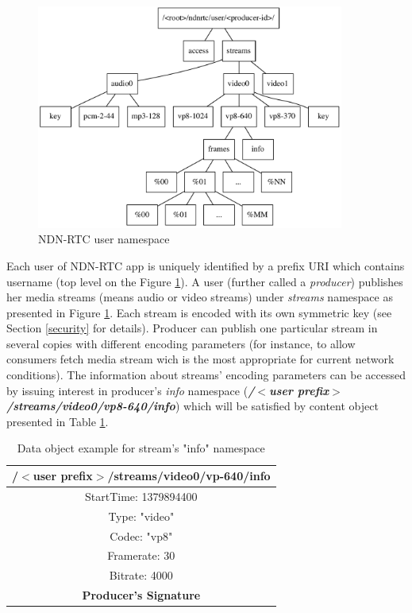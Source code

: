 \documentclass[12pt]{article}
\begin{document}
\begin{figure}[Ht!]
\centering
\includegraphics[width=0.9\textwidth]{../res/graphics/namespace}
\caption{NDN-RTC user namespace}
\label{fig:ns}
\end{figure}

Each user of NDN-RTC app is uniquely identified by a prefix URI which contains username (top level on the Figure \ref{fig:ns}). A user (further called a \textit{producer}) publishes her media streams (means audio or video streams) under \textit{streams} namespace as presented in Figure \ref{fig:ns}. Each stream is encoded with its own symmetric key (see Section \ref{security} for details). Producer can publish one particular stream in several copies with different encoding parameters (for instance, to allow consumers fetch media stream wich is the most appropriate for current network conditions). The information about streams' encoding parameters can be accessed by issuing interest in producer's \textit{info} namespace (\textbf{\textit{/$<$user prefix$>$/streams/video0/vp8-640/info}}) which will be satisfied by content object presented in Table \ref{tab:params}.

\begin{table}
\centering
\caption{Data object example for stream's "info" namespace}
\vspace{1em}
\small{
\begin{tabular}{|c|}
\hline
\textbf{/$<$user prefix$>$/streams/video0/vp-640/info}\\
\hline
StartTime: 1379894400 \\
\hline
Type: "video" \\
\hline
Codec: "vp8" \\
\hline
Framerate: 30 \\
\hline
Bitrate: 4000 \\
\hline
\textbf{Producer's Signature} \\
\hline
\end{tabular}}
\label{tab:params}
\end{table}
\end{document}
